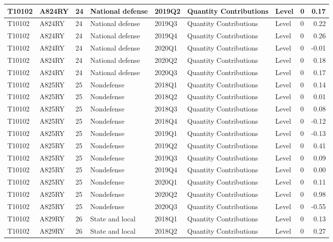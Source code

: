 \documentclass[
]{article}
\begin{document}
\begin{tabular}{l|l|l|l|l|l|l|l|r}
\hline
T10102 & A824RY & 24 & National defense & 2019Q2 & Quantity Contributions & Level & 0 & 0.17\\
\hline
T10102 & A824RY & 24 & National defense & 2019Q3 & Quantity Contributions & Level & 0 & 0.22\\
\hline
T10102 & A824RY & 24 & National defense & 2019Q4 & Quantity Contributions & Level & 0 & 0.26\\
\hline
T10102 & A824RY & 24 & National defense & 2020Q1 & Quantity Contributions & Level & 0 & -0.01\\
\hline
T10102 & A824RY & 24 & National defense & 2020Q2 & Quantity Contributions & Level & 0 & 0.18\\
\hline
T10102 & A824RY & 24 & National defense & 2020Q3 & Quantity Contributions & Level & 0 & 0.17\\
\hline
T10102 & A825RY & 25 & Nondefense & 2018Q1 & Quantity Contributions & Level & 0 & 0.14\\
\hline
T10102 & A825RY & 25 & Nondefense & 2018Q2 & Quantity Contributions & Level & 0 & 0.01\\
\hline
T10102 & A825RY & 25 & Nondefense & 2018Q3 & Quantity Contributions & Level & 0 & 0.08\\
\hline
T10102 & A825RY & 25 & Nondefense & 2018Q4 & Quantity Contributions & Level & 0 & -0.12\\
\hline
T10102 & A825RY & 25 & Nondefense & 2019Q1 & Quantity Contributions & Level & 0 & -0.13\\
\hline
T10102 & A825RY & 25 & Nondefense & 2019Q2 & Quantity Contributions & Level & 0 & 0.41\\
\hline
T10102 & A825RY & 25 & Nondefense & 2019Q3 & Quantity Contributions & Level & 0 & 0.09\\
\hline
T10102 & A825RY & 25 & Nondefense & 2019Q4 & Quantity Contributions & Level & 0 & 0.00\\
\hline
T10102 & A825RY & 25 & Nondefense & 2020Q1 & Quantity Contributions & Level & 0 & 0.11\\
\hline
T10102 & A825RY & 25 & Nondefense & 2020Q2 & Quantity Contributions & Level & 0 & 0.98\\
\hline
T10102 & A825RY & 25 & Nondefense & 2020Q3 & Quantity Contributions & Level & 0 & -0.55\\
\hline
T10102 & A829RY & 26 & State and local & 2018Q1 & Quantity Contributions & Level & 0 & 0.13\\
\hline
T10102 & A829RY & 26 & State and local & 2018Q2 & Quantity Contributions & Level & 0 & 0.27\\

\end{tabular}
\end{document}
